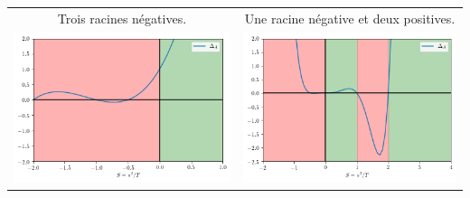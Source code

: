 \documentclass[11pt]{article}
\begin{document}
\begin{tabular}{cc}
Trois racines négatives. & Une racine négative et deux positives.\\
\includegraphics[width=.48\textwidth]{Images/deltacas1.png} & \includegraphics[width=.48\textwidth]{Images/deltacas2.png} \\
\end{tabular}
 \ifdefined\COMPLETE
\else
\end{document}
